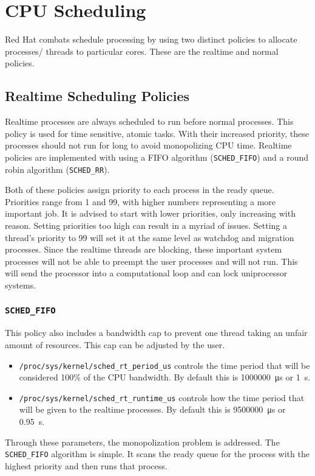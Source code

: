 \documentclass[12pt]{article}
\begin{document}
\section{CPU Scheduling}
Red Hat combats schedule processing by using two distinct policies to allocate processes/ threads to particular cores. These are the realtime and normal policies. 

\subsection{Realtime Scheduling Policies}
Realtime processes are always scheduled to run before normal processes. This policy is used for time sensitive, atomic tasks. With their increased priority, these processes should not run for long to avoid monopolizing CPU time. Realtime policies are implemented with using a FIFO algorithm (\lstinline|SCHED_FIFO|) and a round robin algorithm (\lstinline|SCHED_RR|). 

Both of these policies assign priority to each process in the ready queue. Priorities range from  1 and 99, with higher numbers representing a more important job. It is advised to start with lower priorities, only increasing with reason. Setting priorities too high can result in a myriad of issues. Setting a thread's priority to 99 will set it at the same level as watchdog and migration processes. Since the realtime threads are blocking, these important system processes will not be able to preempt the user processes and will not run. This will send the processor into a computational loop and can lock uniprocessor systems. 

\subsubsection{\lstinline|SCHED_FIFO|}
 This policy also includes a bandwidth cap to prevent one thread taking an unfair amount of resources. This cap can be adjusted by the user. 
\begin{itemize}
	\item \lstinline|/proc/sys/kernel/sched_rt_period_us| controls the time period that will be considered 100\% of the CPU bandwidth. By default this is \SI{1000000}{\micro\second} or \SI{1}{\second}.
	\item \lstinline|/proc/sys/kernel/sched_rt_runtime_us| controls how the time period that will be given to the realtime processes. By default this is \SI{9500000}{\micro\second} or \SI{0.95}{\second}. 
\end{itemize}
Through these parameters, the monopolization problem is addressed. The \lstinline|SCHED_FIFO| algorithm is simple. It scans the ready queue for the process with the highest priority and then runs that process. 
\end{document}
